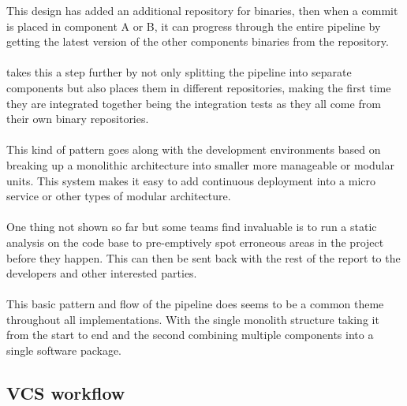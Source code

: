 This design has added an additional repository for binaries, then when a commit is placed in component A or B, it can progress through the entire pipeline by getting the latest version of the other components binaries from the repository. 
\\\\
\cite{thoughworks} takes this a step further by not only splitting the pipeline into separate components  but also places them in different repositories, making the first time they are integrated together being the integration tests as they all come from their own binary repositories.
\\\\
This kind of pattern goes along with the development environments based on breaking up a monolithic architecture  into smaller more manageable or modular units. This system makes it easy to add continuous deployment into a micro service or other types of modular architecture.
\\\\
One thing not shown so far but some teams find invaluable is to run a static analysis on the code base to pre-emptively spot erroneous areas in the project before they happen. This can then be sent back with the rest of the report to the developers and other interested parties.
\\\\
This basic pattern and flow of the pipeline does seems to be a common theme throughout all implementations.  With the single monolith structure taking it from the start to end and the second combining multiple components into a single software package. 

\subsection{VCS workflow}
\label{sec:vcs}

